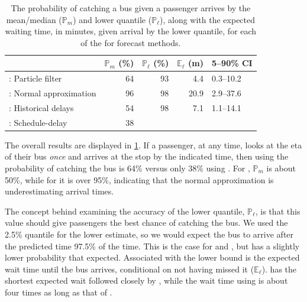 \begin{knitrout}\small
{}\color{fgcolor}\begin{table}

\caption{\label{tab:model_results_pr_miss}The probability of catching a bus given a passenger arrives by the mean/median ($\mathbb{P}_m$) and lower quantile ($\mathbb{P}_\ell$), along with the expected waiting time, in minutes, given arrival by the lower quantile, for each of the for forecast methods.}
\centering
\fontsize{8}{10}\selectfont
\begin{tabular}[t]{lrrrl}
\toprule
  & $\mathbb{P}_m$ (\%) & $\mathbb{P}_\ell$ (\%) & $\mathbb{E}_\ell$ (m) & 5--90\% CI\\
\midrule
\Fpf{}: Particle filter & 64 & 93 & 4.4 & 0.3--10.2\\
\Fnorm{}: Normal approximation & 96 & 98 & 20.9 & 2.9--37.6\\
\Fhist{}: Historical delays & 54 & 98 & 7.1 & 1.1--14.1\\
\Fsched{}: Schedule-delay & 38 &  &  & \\
\bottomrule
\end{tabular}
\end{table}


\end{knitrout}

The overall results are displayed in \cref{tab:model_results_pr_miss}. If a passenger, at any time, looks at the \gls{eta} of their bus \emph{once} and arrives at the stop by the indicated time, then using \Fpf{} the probability of catching the bus is 64\% versus only 38\% using \Fsched{}. For \Fhist{}, $\mathbb{P}_m$ is about 50\%, while for \Fnorm{} it is over 95\%, indicating that the normal approximation is underestimating arrival times.


The concept behind examining the accuracy of the lower quantile, $\mathbb{P}_\ell$, is that this value should give passengers the best chance of catching the bus. We used the 2.5\% quantile for the lower estimate, so we would expect the bus to arrive after the predicted time 97.5\% of the time. This is the case for \Fnorm{} and \Fhist{}, but \Fpf{} has a slightly lower probability that expected. Associated with the lower bound is the expected wait time until the bus arrives, conditional on not having missed it ($\mathbb{E}_\ell$). \Fpf{} has the shortest expected wait followed closely by \Fhist{}, while the wait time using \Fnorm{} is about four times as long as that of \Fpf{}.


